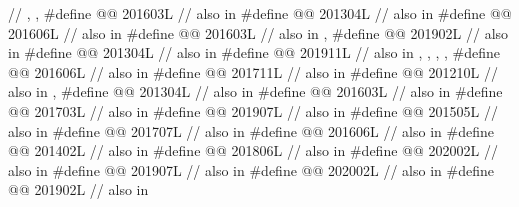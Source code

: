 \begin{codeblock}
  // , , 
#define @@                            201603L // also in 
#define @@                    201304L // also in 
#define @@                          201606L // also in 
#define @@                201603L // also in , 
#define @@             201902L // also in 
#define @@                  201304L // also in 
#define @@                            201911L
  // also in , , , , 
#define @@             201606L // also in 
#define @@                      201711L // also in 
#define @@                  201210L // also in , 
#define @@       201304L // also in 
#define @@                            201603L // also in 
#define @@                       201703L // also in 
#define @@                         201907L // also in 
#define @@                      201505L // also in 
#define @@                 201707L // also in 
#define @@              201606L // also in 
#define @@                201402L // also in 
#define @@                             201806L // also in 
#define @@           202002L // also in 
#define @@                   201907L // also in 
#define @@                              202002L // also in 
#define @@                             201902L // also in 

\end{codeblock}

